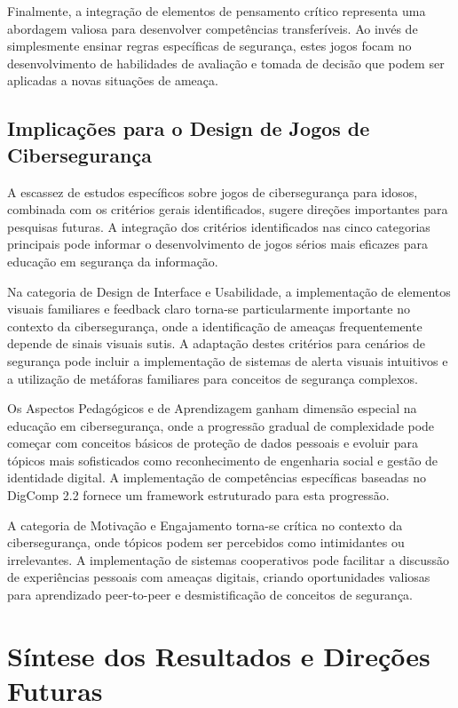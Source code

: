 \begin{table}[H]
Finalmente, a integração de elementos de pensamento crítico representa uma abordagem valiosa para desenvolver competências transferíveis. Ao invés de simplesmente ensinar regras específicas de segurança, estes jogos focam no desenvolvimento de habilidades de avaliação e tomada de decisão que podem ser aplicadas a novas situações de ameaça.

\subsection{Implicações para o Design de Jogos de Cibersegurança}
\label{subsec:implicacoes_design}

A escassez de estudos específicos sobre jogos de cibersegurança para idosos, combinada com os critérios gerais identificados, sugere direções importantes para pesquisas futuras. A integração dos critérios identificados nas cinco categorias principais pode informar o desenvolvimento de jogos sérios mais eficazes para educação em segurança da informação.

Na categoria de Design de Interface e Usabilidade, a implementação de elementos visuais familiares e feedback claro torna-se particularmente importante no contexto da cibersegurança, onde a identificação de ameaças frequentemente depende de sinais visuais sutis. A adaptação destes critérios para cenários de segurança pode incluir a implementação de sistemas de alerta visuais intuitivos e a utilização de metáforas familiares para conceitos de segurança complexos.

Os Aspectos Pedagógicos e de Aprendizagem ganham dimensão especial na educação em cibersegurança, onde a progressão gradual de complexidade pode começar com conceitos básicos de proteção de dados pessoais e evoluir para tópicos mais sofisticados como reconhecimento de engenharia social e gestão de identidade digital. A implementação de competências específicas baseadas no DigComp 2.2 fornece um framework estruturado para esta progressão.

A categoria de Motivação e Engajamento torna-se crítica no contexto da cibersegurança, onde tópicos podem ser percebidos como intimidantes ou irrelevantes. A implementação de sistemas cooperativos pode facilitar a discussão de experiências pessoais com ameaças digitais, criando oportunidades valiosas para aprendizado peer-to-peer e desmistificação de conceitos de segurança.

\section{Síntese dos Resultados e Direções Futuras}
\label{sec:sintese}


\end{table}
